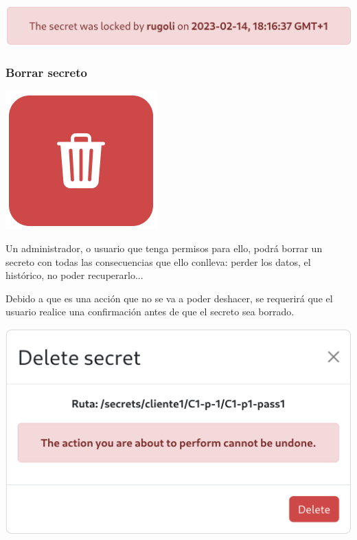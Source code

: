 \documentclass{\ClassPath/viu-tfm-template}
\begin{document}
\begin{center}
    \includegraphics[width=0.8\linewidth]{img/unlock_warning.png}
\end{center}


\subsubsection*{Borrar secreto}
{
\begin{minipage}{0.1\linewidth}
    \includegraphics[width=\linewidth]{img/delete.png}
\end{minipage}
\hspace{0.5cm}
\begin{minipage}{0.9\linewidth}
    Un administrador, o usuario que tenga permisos para ello, podrá borrar un secreto con todas las consecuencias que ello conlleva: perder los datos, el histórico, no poder recuperarlo...
\end{minipage}
}

Debido a que es una acción que no se va a poder deshacer, se requerirá que el usuario realice una confirmación antes de que el secreto sea borrado.
\vspace{-8pt}
\begin{center}
    \includegraphics[width=0.6\linewidth]{img/delete_warning.png}
\end{center}
\end{document}
